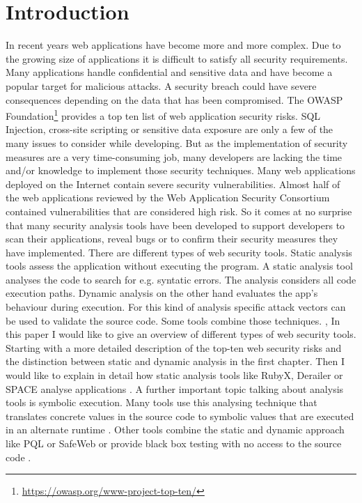 \section{Introduction}
\label{section:Introduction}
In recent years web applications have become more and more complex. Due to the growing size of applications it is difficult to satisfy all security requirements. Many applications handle confidential and sensitive data and have become a popular target for malicious attacks. A security breach could have severe consequences depending on the data that has been compromised. The OWASP Foundation\footnote{ \url{https://owasp.org/www-project-top-ten/}} provides a top ten list of web application security risks. SQL Injection, cross-site scripting or sensitive data exposure are only a few of the many issues to consider while developing. But as the implementation of security measures are a very time-consuming job, many developers are lacking the time and/or knowledge to implement those security techniques. Many web applications deployed on the Internet contain severe security vulnerabilities. Almost half of the web applications reviewed by the Web Application Security Consortium contained vulnerabilities that are considered high risk. \autocite[2]{Li2014}
So it comes at no surprise that many security analysis tools have been developed to support developers to scan their applications, reveal bugs or to confirm their security measures they have implemented. There are different types of web security tools. Static analysis tools assess the application without executing the program. A static analysis tool analyses the code to search for e.g. syntatic errors. The analysis considers all code execution paths. Dynamic analysis on the other hand evaluates the app's behaviour during execution. For this kind of analysis specific attack vectors can be used to validate the source code. Some tools combine those techniques. \autocite[]{Lam2008}, \autocite[]{Hosek2011} 
In this paper I would like to give an overview of different types of web security tools. Starting with a more detailed description of the top-ten web security risks and the distinction between static and dynamic analysis in the first chapter. Then I would like to explain in detail how static analysis tools like RubyX, Derailer or SPACE analyse applications \autocite[]{Chaudhuri2010} \autocite[]{Near2014} \autocite[]{Near2016}. A further important topic talking about analysis tools is symbolic execution. Many tools use this analysing technique that translates concrete values in the source code to symbolic values that are executed in an alternate runtime \autocite[]{Bocic2017} \autocite[]{Near2016} \autocite[]{Near2012}. Other tools combine the static and dynamic approach like PQL or SafeWeb or provide black box testing with no access to the source code \autocite[]{Lam2008} \autocite[]{Hosek2011} \autocite[]{Araujo2018}.





